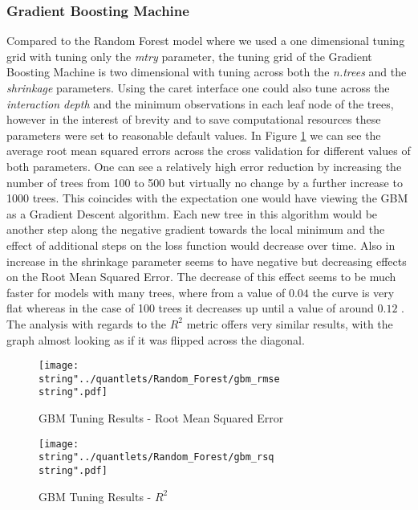 \subsubsection{Gradient Boosting Machine}
Compared to the Random Forest model where we used a one dimensional tuning grid with tuning only the \textit{mtry} parameter, the tuning grid of the Gradient Boosting Machine is two dimensional with tuning across both the \textit{n.trees} and the \textit{shrinkage} parameters.
Using the caret interface one could also tune across the \textit{interaction depth} and the minimum observations in each leaf node of the trees, however in the interest of brevity and to save computational resources these parameters were set to reasonable default values. 
In Figure \ref{fig:gmb_rmse} we can see the average root mean squared errors across the cross validation for different values of both parameters. One can see a relatively high error reduction by increasing the number of trees from 100 to 500 but virtually no change by a further increase to 1000 trees. This coincides with the expectation one would have viewing the GBM as a Gradient Descent algorithm. Each new tree in this algorithm would be another step along the negative gradient towards the local minimum and the effect of additional steps on the loss function would decrease over time. Also in increase in the shrinkage parameter seems to have negative but decreasing effects on the Root Mean Squared Error. The decrease of this effect seems to be much faster for models with many trees, where from a value of $0.04$ the curve is very flat whereas in the case of 100 trees it decreases up until a value of around $0.12$ . The analysis with regards to the $R^2$ metric offers very similar results, with the graph almost looking as if it was flipped across the diagonal. 


\begin{figure}
  \centering
\texttt{[image: \\string"../quantlets/Random\_Forest/gbm\_rmse\\string".pdf]}
  \caption{GBM Tuning Results - Root Mean Squared Error}\label{fig:gmb_rmse}
\end{figure}

\begin{figure}
  \centering
\texttt{[image: \\string"../quantlets/Random\_Forest/gbm\_rsq\\string".pdf]}
  \caption{GBM Tuning Results - $R^2$}\label{fig:gbm_rsq}
\end{figure}